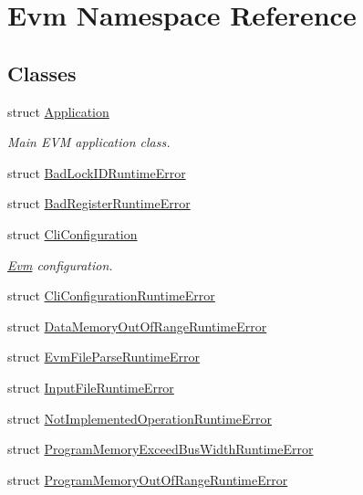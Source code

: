 \hypertarget{namespace_evm}{}\section{Evm Namespace Reference}
\label{namespace_evm}
\subsection*{Classes}
\begin{DoxyCompactItemize}
\item 
struct \mbox{\hyperlink{struct_evm_1_1_application}{Application}}
\begin{DoxyCompactList}\small\item\em Main E\+VM application class. \end{DoxyCompactList}\item 
struct \mbox{\hyperlink{struct_evm_1_1_bad_lock_i_d_runtime_error}{Bad\+Lock\+I\+D\+Runtime\+Error}}
\item 
struct \mbox{\hyperlink{struct_evm_1_1_bad_register_runtime_error}{Bad\+Register\+Runtime\+Error}}
\item 
struct \mbox{\hyperlink{struct_evm_1_1_cli_configuration}{Cli\+Configuration}}
\begin{DoxyCompactList}\small\item\em \mbox{\hyperlink{namespace_evm}{Evm}} configuration. \end{DoxyCompactList}\item 
struct \mbox{\hyperlink{struct_evm_1_1_cli_configuration_runtime_error}{Cli\+Configuration\+Runtime\+Error}}
\item 
struct \mbox{\hyperlink{struct_evm_1_1_data_memory_out_of_range_runtime_error}{Data\+Memory\+Out\+Of\+Range\+Runtime\+Error}}
\item 
struct \mbox{\hyperlink{struct_evm_1_1_evm_file_parse_runtime_error}{Evm\+File\+Parse\+Runtime\+Error}}
\item 
struct \mbox{\hyperlink{struct_evm_1_1_input_file_runtime_error}{Input\+File\+Runtime\+Error}}
\item 
struct \mbox{\hyperlink{struct_evm_1_1_not_implemented_operation_runtime_error}{Not\+Implemented\+Operation\+Runtime\+Error}}
\item 
struct \mbox{\hyperlink{struct_evm_1_1_program_memory_exceed_bus_width_runtime_error}{Program\+Memory\+Exceed\+Bus\+Width\+Runtime\+Error}}
\item 
struct \mbox{\hyperlink{struct_evm_1_1_program_memory_out_of_range_runtime_error}{Program\+Memory\+Out\+Of\+Range\+Runtime\+Error}}

\end{DoxyCompactItemize}
